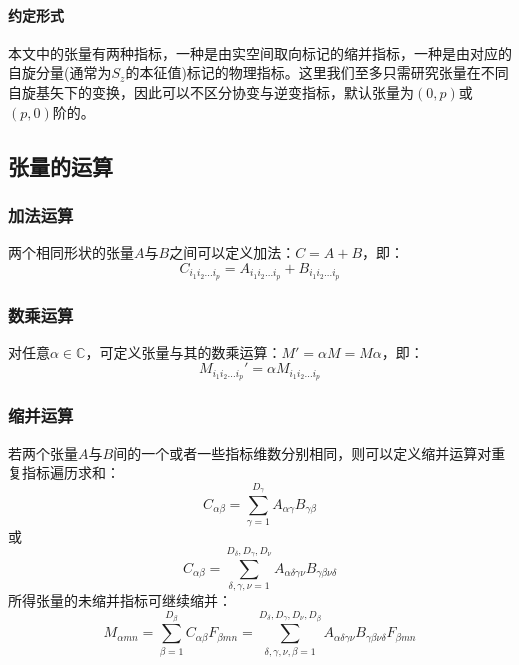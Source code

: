 \paragraph{约定形式}
本文中的张量有两种指标，一种是由实空间取向标记的缩并指标，一种是由对应的自旋分量(通常为$S_z$的本征值)标记的物理指标。这里我们至多只需研究张量在不同自旋基矢下的变换，因此可以不区分协变与逆变指标，默认张量为$(0,p)$或$(p,0)$阶的。

\subsection{张量的运算}

\subsubsection{加法运算}

两个相同形状的张量$A$与$B$之间可以定义加法：$C = A+B$，即：
\begin{equation}
C_{i_1 i_2 \dots i_p} = A_{i_1 i_2 \dots i_p} + B_{i_1 i_2 \dots i_p}
\end{equation}


\subsubsection{数乘运算}

对任意$\alpha \in \mathbb{C}$，可定义张量与其的数乘运算：$M' = \alpha M = M \alpha$，即：
\begin{equation}
M_{i_1 i_2 \dots i_p}' = \alpha M_{i_1 i_2 \dots i_p}
\end{equation}

\subsubsection{缩并运算}

若两个张量$A$与$B$间的一个或者一些指标维数分别相同，则可以定义缩并运算对重复指标遍历求和：
\begin{equation}
C_{\alpha\beta} = \sum_{\gamma=1}^{D_\gamma} A_{\alpha\gamma} B_{\gamma\beta}
\end{equation}
或
\begin{equation}
C_{\alpha\beta} = \sum_{\delta,\gamma,\nu=1}^{D_\delta,D_\gamma,D_\nu} A_{\alpha\delta\gamma\nu} B_{\gamma\beta\nu\delta}
\end{equation}
所得张量的未缩并指标可继续缩并：
\begin{equation}
\label{eq.1.5}
M_{\alpha m n} = \sum_{\beta=1}^{D_\beta} C_{\alpha\beta} F_{\beta m n}
	= \sum_{\delta,\gamma,\nu,\beta=1}^{D_\delta,D_\gamma,D_\nu,D_\beta} A_{\alpha\delta\gamma\nu} B_{\gamma\beta\nu\delta} F_{\beta m n}
\end{equation}

